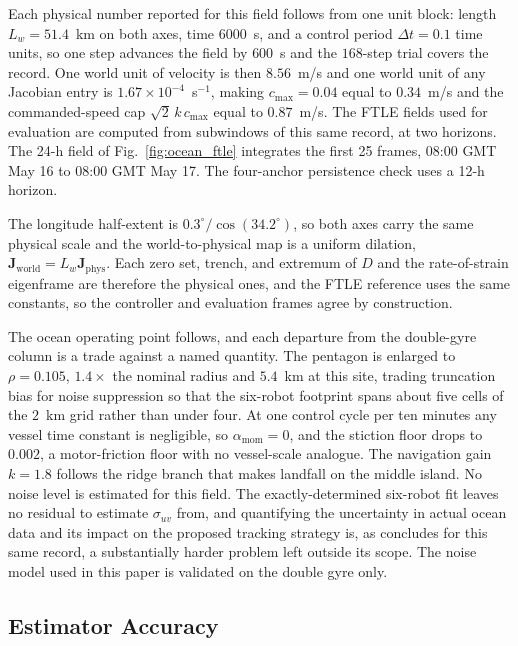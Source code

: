 \documentclass[lettersize,journal]{IEEEtran}
\begin{document}
Each physical number reported for this field follows from one unit
block: length $L_w = 51.4$~km on both axes, time $6000$~s, and a control
period $\Delta t = 0.1$ time units, so one step advances the field by
$600$~s and the $168$-step trial covers the record. One world unit of
velocity is then $8.56$~m/s and one world unit of any Jacobian entry is
$1.67 \times 10^{-4}$~s$^{-1}$, making $c_{\max} = 0.04$ equal to
$0.34$~m/s and the commanded-speed cap $\sqrt{2}\,k\,c_{\max}$ equal to
$0.87$~m/s. The FTLE fields used for evaluation are computed
from subwindows of this same record, at two horizons. The 24-h field of
Fig.~\ref{fig:ocean_ftle} integrates the first 25 frames, 08:00 GMT
May 16 to 08:00 GMT May 17. The four-anchor persistence check
uses a 12-h horizon.

The longitude half-extent is $0.3^{\circ}/\cos(34.2^{\circ})$, so both
axes carry the same physical scale and the world-to-physical map is a
uniform dilation, $\mathbf{J}_{\mathrm{world}} = L_w
\mathbf{J}_{\mathrm{phys}}$. Each zero set, trench, and extremum of $D$
and the rate-of-strain eigenframe are therefore the physical ones, and
the FTLE reference uses the same constants, so the controller and
evaluation frames agree by construction.

The ocean operating point follows, and each departure from the
double-gyre column is a trade against a named quantity. The pentagon is
enlarged to $\rho = 0.105$, $1.4\times$ the nominal radius and $5.4$~km
at this site, trading truncation bias for noise suppression so that the
six-robot footprint spans about five cells of the $2$~km grid rather
than under four. At one control cycle per ten minutes any vessel time
constant is negligible, so $\alpha_{\text{mom}} = 0$, and the stiction
floor drops to $0.002$, a motor-friction floor with no vessel-scale
analogue. The navigation gain $k = 1.8$ follows the ridge branch that
makes landfall on the middle island. No noise level is estimated
for this field. The exactly-determined six-robot fit leaves no residual
to estimate $\sigma_{uv}$ from, and quantifying the uncertainty in
actual ocean data and its impact on the proposed tracking strategy is,
as \cite{26} concludes for this same record, a substantially harder
problem left outside its scope. The noise model used in this paper is
validated on the double gyre only.

\subsection{Estimator Accuracy}
\label{sec:results_est}
\end{document}
